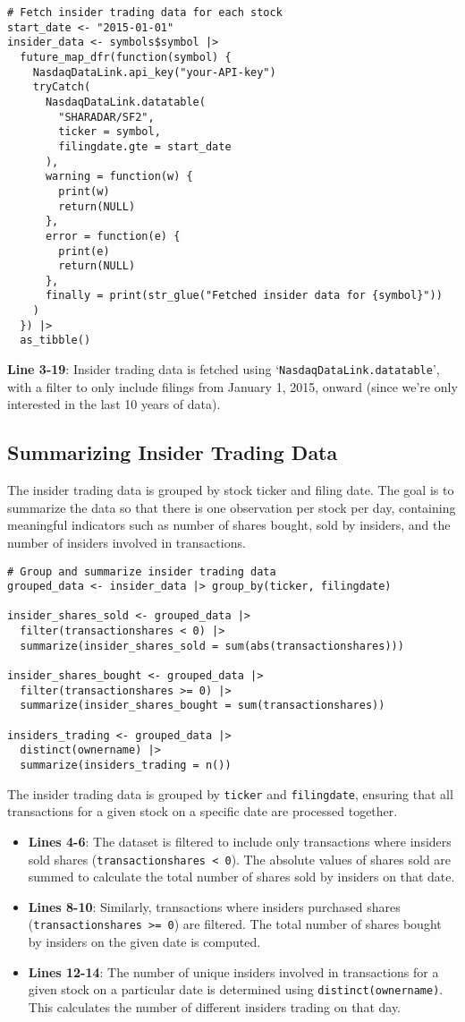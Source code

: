 \documentclass[12pt,letterpaper]{article}
\begin{document}
\begin{verbatim}
# Fetch insider trading data for each stock
start_date <- "2015-01-01"
insider_data <- symbols$symbol |>
  future_map_dfr(function(symbol) {
    NasdaqDataLink.api_key("your-API-key")
    tryCatch(
      NasdaqDataLink.datatable(
        "SHARADAR/SF2", 
        ticker = symbol,
        filingdate.gte = start_date
      ),
      warning = function(w) {
        print(w)
        return(NULL)
      },
      error = function(e) {
        print(e)
        return(NULL)
      },
      finally = print(str_glue("Fetched insider data for {symbol}"))
    )
  }) |>
  as_tibble()
\end{verbatim}
\textbf{Line 3-19}: Insider trading data is fetched using `\texttt{NasdaqDataLink.datatable}', with a filter to only include filings from January 1, 2015, onward (since we're only interested in the last 10 years of data).

\subsection{Summarizing Insider Trading Data}
The insider trading data is grouped by stock ticker and filing date. The goal
is to summarize the data so that there is one observation per stock per day,
containing meaningful indicators such as number of shares bought, sold by
insiders, and the number of insiders involved in transactions.

\begin{verbatim}
# Group and summarize insider trading data
grouped_data <- insider_data |> group_by(ticker, filingdate)

insider_shares_sold <- grouped_data |>
  filter(transactionshares < 0) |>
  summarize(insider_shares_sold = sum(abs(transactionshares)))

insider_shares_bought <- grouped_data |>
  filter(transactionshares >= 0) |>
  summarize(insider_shares_bought = sum(transactionshares))

insiders_trading <- grouped_data |>
  distinct(ownername) |>
  summarize(insiders_trading = n())
\end{verbatim}
The insider trading data is grouped by \texttt{ticker} and \texttt{filingdate}, ensuring that all transactions for a given stock on a specific date are processed together.

\begin{itemize}
  \item \textbf{Lines 4-6}: The dataset is filtered to include only transactions where insiders sold shares (\texttt{transactionshares < 0}). The absolute values of shares sold are summed to calculate the total number of shares sold by insiders on that date.
  \item \textbf{Lines 8-10}: Similarly, transactions where insiders purchased shares (\texttt{transactionshares >= 0}) are filtered. The total number of shares bought by insiders on the given date is computed.
  \item \textbf{Lines 12-14}: The number of unique insiders involved in transactions for a given stock on a particular date is determined using \texttt{distinct(ownername)}. This calculates the number of different insiders trading on that day.
\end{itemize}
\end{document}
